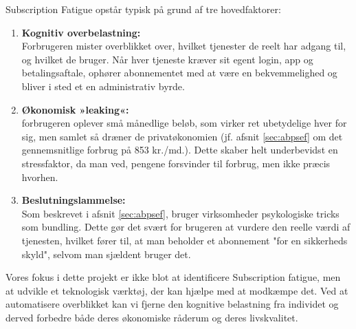 Subscription Fatigue opstår typisk på grund af tre hovedfaktorer:
\begin{enumerate}
    \item \textbf{Kognitiv overbelastning:}\\
    Forbrugeren mister overblikket over, hvilket tjenester de reelt har adgang til, og hvilket de bruger. Når hver tjeneste kræver sit egent login, app og betalingsaftale, ophører abonnementet med at være en bekvemmelighed og bliver i sted et en administrativ byrde. 
    \item \textbf{Økonomisk »leaking«:}\\
    forbrugeren oplever små månedlige beløb, som virker ret ubetydelige hver for sig, men samlet så dræner de privatøkonomien (jf. afsnit \ref{sec:abpsef} om det gennemsnitlige forbrug på 853 kr./md.). Dette skaber helt underbevidst en stressfaktor, da man ved, pengene forsvinder til forbrug, men ikke præcis hvorhen.
    \item \textbf{Beslutningslammelse:}\\
    Som beskrevet i afsnit \ref{sec:abpsef}, bruger virksomheder psykologiske tricks som bundling. Dette gør det svært for brugeren at vurdere den reelle værdi af tjenesten, hvilket fører til, at man beholder et abonnement "for en sikkerheds skyld", selvom man sjældent bruger det. 
\end{enumerate}
 
Vores fokus i dette projekt er ikke blot at identificere Subscription fatigue, men at udvikle et teknologisk værktøj, der kan hjælpe med at modkæmpe det. Ved at automatisere overblikket kan vi fjerne den kognitive belastning fra individet og derved forbedre både deres økonomiske råderum og deres livskvalitet.
 